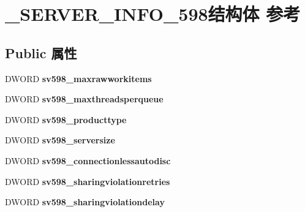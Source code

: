 \hypertarget{struct___s_e_r_v_e_r___i_n_f_o__598}{}\section{\+\_\+\+S\+E\+R\+V\+E\+R\+\_\+\+I\+N\+F\+O\+\_\+598结构体 参考}
\label{struct___s_e_r_v_e_r___i_n_f_o__598}
\subsection*{Public 属性}
\begin{DoxyCompactItemize}
\item 
\mbox{\label{struct___s_e_r_v_e_r___i_n_f_o__598_a03ee2abeab3aa3e41ab54bface8d13ec}} 
D\+W\+O\+RD {\bfseries sv598\+\_\+maxrawworkitems}
\item 
\mbox{\label{struct___s_e_r_v_e_r___i_n_f_o__598_ad818df0ca40f6f039fa6592fec4796cf}} 
D\+W\+O\+RD {\bfseries sv598\+\_\+maxthreadsperqueue}
\item 
\mbox{\label{struct___s_e_r_v_e_r___i_n_f_o__598_a30eda2a63e11b7fb11fe71946cdec7df}} 
D\+W\+O\+RD {\bfseries sv598\+\_\+producttype}
\item 
\mbox{\label{struct___s_e_r_v_e_r___i_n_f_o__598_a6a8f5761de8c49aa360de50bb18b3244}} 
D\+W\+O\+RD {\bfseries sv598\+\_\+serversize}
\item 
\mbox{\label{struct___s_e_r_v_e_r___i_n_f_o__598_a430a1eae43cf35362ff936abff8c3ec5}} 
D\+W\+O\+RD {\bfseries sv598\+\_\+connectionlessautodisc}
\item 
\mbox{\label{struct___s_e_r_v_e_r___i_n_f_o__598_adc5c93a4c46714ae5b4598df01028d2c}} 
D\+W\+O\+RD {\bfseries sv598\+\_\+sharingviolationretries}
\item 
\mbox{\label{struct___s_e_r_v_e_r___i_n_f_o__598_a690748c10061e2e23006271d13c9f143}} 
D\+W\+O\+RD {\bfseries sv598\+\_\+sharingviolationdelay}
\item 

\end{DoxyCompactItemize}
